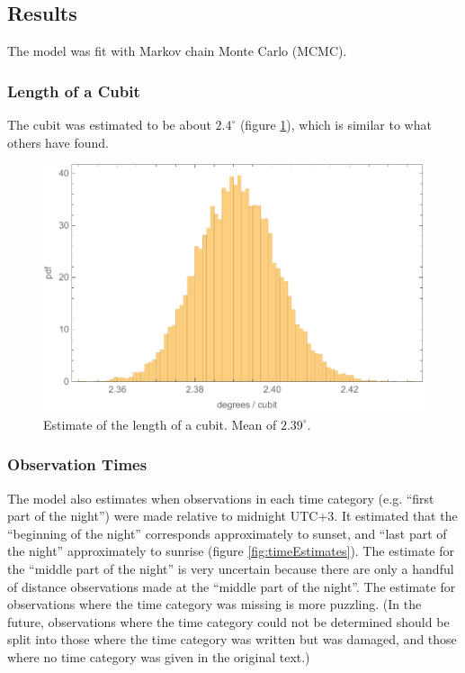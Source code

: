 \documentclass{article}
\begin{document}
\subsection{Results}
The model was fit with Markov chain Monte Carlo (MCMC).

\subsubsection{Length of a Cubit}
The cubit was estimated to be about $2.4^\circ$ (figure \ref{fig:lengthOfCubit}), which is similar to what others have found.

\begin{figure}[h]
    \centering
    \includegraphics[width=0.6\linewidth]{lengthOfCubit.pdf}
    \caption{Estimate of the length of a cubit. Mean of $2.39^\circ$.}
    \label{fig:lengthOfCubit}
\end{figure}

\subsubsection{Observation Times}
The model also estimates when observations in each time category (e.g. ``first part of the night'') were made relative to midnight UTC+3. It estimated that the ``beginning of the night'' corresponds approximately to sunset, and ``last part of the night'' approximately to sunrise (figure \ref{fig:timeEstimates}). The estimate for the ``middle part of the night'' is very uncertain because there are only a handful of distance observations made at the ``middle part of the night''. The estimate for observations where the time category was missing is more puzzling. (In the future, observations where the time category could not be determined should be split into those where the time category was written but was damaged, and those where no time category was given in the original text.)
\end{document}
